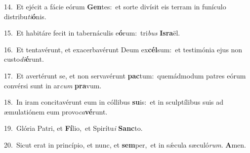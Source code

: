 {\numbfont\textcolor{\numbcolor}{14.}}~Et ejécit a fácie eórum \textbf{Gen}\-tes:~\star et sorte divísit eis terram in funículo distribu\-\textit{ti}\-\textbf{ó}nis.\par
{\numbfont\textcolor{\numbcolor}{15.}}~Et habitáre fecit in tabernáculis e\-\textbf{ó}\-rum:~\star tri\textit{bus} \textbf{Is}\-\textbf{ra}ël.\par
{\numbfont\textcolor{\numbcolor}{16.}}~Et tentavérunt, et exacerbavérunt Deum ex\-\textbf{cél}\-sum:~\star et testimónia ejus non custo\-\textit{di}\-\textbf{é}runt.\par
{\numbfont\textcolor{\numbcolor}{17.}}~Et avertérunt se, et non servavérunt \textbf{pac}\-tum:~\star quemádmodum patres eórum convérsi sunt in ar\textit{cum} \textbf{pra}\-vum.\par
{\numbfont\textcolor{\numbcolor}{18.}}~In iram concitavérunt eum in cóllibus \textbf{su}\-is:~\star et in sculptílibus suis ad æmulatiónem eum provo\-\textit{ca}\-\textbf{vé}runt.\par
{\numbfont\textcolor{\numbcolor}{19.}}~Glória Patri, et \textbf{Fí}\-lio,~\star et Spirítu\textit{i} \textbf{Sanc}\-to.\par
{\numbfont\textcolor{\numbcolor}{20.}}~Sicut erat in princípio, et nunc, et \textbf{sem}\-per,~\star et in sǽcula sæculó\-\textit{rum}\-. \textbf{A}\-men.\par
